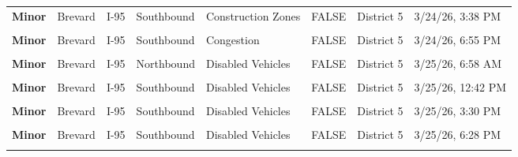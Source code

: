 \documentclass[
]{article}
\begin{document}
\begin{longtable}[t]{>{\raggedright\arraybackslash}p{1.5cm}>{\raggedright\arraybackslash}p{2.5cm}>{\raggedright\arraybackslash}p{3cm}>{\raggedright\arraybackslash}p{1.8cm}>{\raggedright\arraybackslash}p{2.5cm}lll}
\textbf{Minor} & Brevard & I-95 & Southbound & Construction Zones & FALSE & District 5 & 3/24/26, 3:38 PM\\
\textbf{\cellcolor{gray!10}{Minor}} & \cellcolor{gray!10}{Brevard} & \cellcolor{gray!10}{I-95} & \cellcolor{gray!10}{Northbound} & \cellcolor{gray!10}{Disabled Vehicles} & \cellcolor{gray!10}{FALSE} & \cellcolor{gray!10}{District 5} & \cellcolor{gray!10}{3/24/26, 4:09 PM}\\
\textbf{Minor} & Brevard & I-95 & Southbound & Congestion & FALSE & District 5 & 3/24/26, 6:55 PM\\
\textbf{\cellcolor{gray!10}{Minor}} & \cellcolor{gray!10}{Brevard} & \cellcolor{gray!10}{I-95} & \cellcolor{gray!10}{Northbound} & \cellcolor{gray!10}{Disabled Vehicles} & \cellcolor{gray!10}{FALSE} & \cellcolor{gray!10}{District 5} & \cellcolor{gray!10}{3/24/26, 8:17 PM}\\
\addlinespace
\textbf{Minor} & Brevard & I-95 & Northbound & Disabled Vehicles & FALSE & District 5 & 3/25/26, 6:58 AM\\
\textbf{\cellcolor{gray!10}{Minor}} & \cellcolor{gray!10}{Brevard} & \cellcolor{gray!10}{I-95} & \cellcolor{gray!10}{Southbound} & \cellcolor{gray!10}{Incidents} & \cellcolor{gray!10}{FALSE} & \cellcolor{gray!10}{District 5} & \cellcolor{gray!10}{3/25/26, 1:22 PM}\\
\textbf{Minor} & Brevard & I-95 & Southbound & Disabled Vehicles & FALSE & District 5 & 3/25/26, 12:42 PM\\
\textbf{\cellcolor{gray!10}{Minor}} & \cellcolor{gray!10}{Brevard} & \cellcolor{gray!10}{I-95} & \cellcolor{gray!10}{Southbound} & \cellcolor{gray!10}{Disabled Vehicles} & \cellcolor{gray!10}{FALSE} & \cellcolor{gray!10}{District 5} & \cellcolor{gray!10}{3/25/26, 1:11 PM}\\
\textbf{Minor} & Brevard & I-95 & Southbound & Disabled Vehicles & FALSE & District 5 & 3/25/26, 3:30 PM\\
\addlinespace
\textbf{\cellcolor{gray!10}{Minor}} & \cellcolor{gray!10}{Brevard} & \cellcolor{gray!10}{I-95} & \cellcolor{gray!10}{Southbound} & \cellcolor{gray!10}{Incidents} & \cellcolor{gray!10}{FALSE} & \cellcolor{gray!10}{District 5} & \cellcolor{gray!10}{3/25/26, 5:27 PM}\\
\textbf{Minor} & Brevard & I-95 & Southbound & Disabled Vehicles & FALSE & District 5 & 3/25/26, 6:28 PM\\
\textbf{\cellcolor{gray!10}{Minor}} & \cellcolor{gray!10}{Brevard} & \cellcolor{gray!10}{I-95} & \cellcolor{gray!10}{Northbound} & \cellcolor{gray!10}{Construction Zones} & \cellcolor{gray!10}{FALSE} & \cellcolor{gray!10}{District 5} & \cellcolor{gray!10}{3/26/26, 5:36 AM}\\

\end{longtable}
\end{document}
